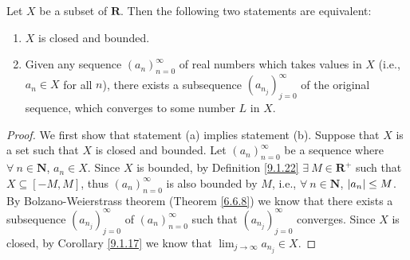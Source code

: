 \begin{theorem}\label{9.1.24}
    Let \(X\) be a subset of \(\mathbf{R}\).
    Then the following two statements are equivalent:
    \begin{enumerate}
        \item \(X\) is closed and bounded.
        \item Given any sequence \((a_n)_{n = 0}^\infty\) of real numbers which takes values in \(X\) (i.e., \(a_n \in X\) for all \(n\)), there exists a subsequence \((a_{n_j})_{j = 0}^\infty\) of the original sequence, which converges to some number \(L\) in \(X\).
    \end{enumerate}
\end{theorem}

\begin{proof}
    We first show that statement (a) implies statement (b).
    Suppose that \(X\) is a set such that \(X\) is closed and bounded.
    Let \((a_n)_{n = 0}^\infty\) be a sequence where \(\forall\ n \in \mathbf{N}\), \(a_n \in X\).
    Since \(X\) is bounded, by Definition \ref{9.1.22} \(\exists\ M \in \mathbf{R}^+\) such that \(X \subseteq [-M, M]\), thus \((a_n)_{n = 0}^\infty\) is also bounded by \(M\), i.e., \(\forall\ n \in \mathbf{N}\), \(\abs*{a_n} \leq M\).
    By Bolzano-Weierstrass theorem (Theorem \ref{6.6.8}) we know that there exists a subsequence \((a_{n_j})_{j = 0}^\infty\) of \((a_n)_{n = 0}^\infty\) such that \((a_{n_j})_{j = 0}^\infty\) converges.
    Since \(X\) is closed, by Corollary \ref{9.1.17} we know that \(\lim_{j \to \infty} a_{n_j} \in X\).


\end{proof}
